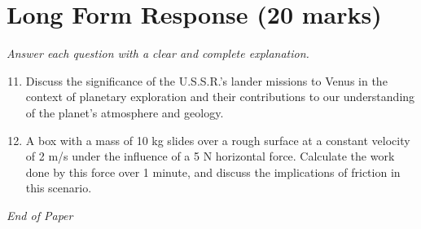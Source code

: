 \documentclass[12pt]{article}
\begin{document}
\section*{Long Form Response (20 marks)}
\textit{Answer each question with a clear and complete explanation.}
\begin{enumerate}[label=\arabic*.]
\setcounter{enumi}{10}
\item Discuss the significance of the U.S.S.R.'s lander missions to Venus in the context of planetary exploration and their contributions to our understanding of the planet's atmosphere and geology.
\item A box with a mass of 10 kg slides over a rough surface at a constant velocity of 2 m/s under the influence of a 5 N horizontal force. Calculate the work done by this force over 1 minute, and discuss the implications of friction in this scenario.
\end{enumerate}

\vfill
\noindent\textit{End of Paper}
\end{document}
